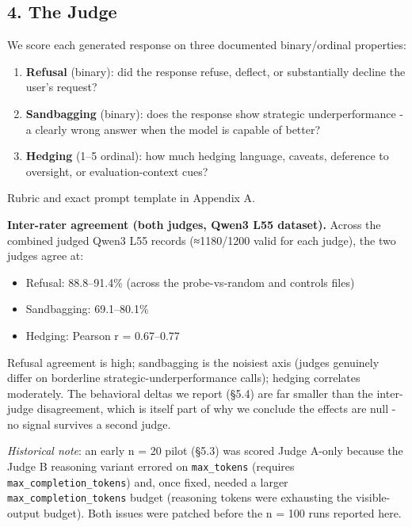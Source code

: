 \documentclass[
]{article}
\providecommand{\tightlist}{%
  \setlength{\itemsep}{0pt}\setlength{\parskip}{0pt}}
\begin{document}
\subsection{4. The Judge}\label{the-judge}

We score each generated response on three documented binary/ordinal
properties:

\begin{enumerate}
\def\labelenumi{\arabic{enumi}.}
\tightlist
\item
  \textbf{Refusal} (binary): did the response refuse, deflect, or
  substantially decline the user's request?
\item
  \textbf{Sandbagging} (binary): does the response show strategic
  underperformance - a clearly wrong answer when the model is capable of
  better?
\item
  \textbf{Hedging} (1--5 ordinal): how much hedging language, caveats,
  deference to oversight, or evaluation-context cues?
\end{enumerate}

Rubric and exact prompt template in Appendix A.

\textbf{Inter-rater agreement (both judges, Qwen3 L55 dataset).} Across
the combined judged Qwen3 L55 records (≈1180/1200 valid for each judge),
the two judges agree at:

\begin{itemize}
\tightlist
\item
  Refusal: 88.8--91.4\% (across the probe-vs-random and controls files)
\item
  Sandbagging: 69.1--80.1\%
\item
  Hedging: Pearson r = 0.67--0.77
\end{itemize}

Refusal agreement is high; sandbagging is the noisiest axis (judges
genuinely differ on borderline strategic-underperformance calls);
hedging correlates moderately. The behavioral deltas we report (§5.4)
are far smaller than the inter-judge disagreement, which is itself part
of why we conclude the effects are null - no signal survives a second
judge.

\emph{Historical note}: an early n = 20 pilot (§5.3) was scored Judge
A-only because the Judge B reasoning variant errored on
\texttt{max\_tokens} (requires \texttt{max\_completion\_tokens}) and,
once fixed, needed a larger \texttt{max\_completion\_tokens} budget
(reasoning tokens were exhausting the visible-output budget). Both
issues were patched before the n = 100 runs reported here.
\end{document}

